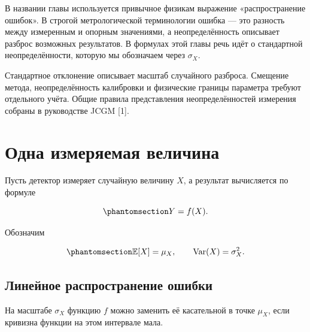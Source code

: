 \documentclass[
  russian,
  11pt,
  a4paper,
  open=any]{scrbook}
\begin{document}
В названии главы используется привычное физикам выражение
«распространение ошибок». В строгой метрологической терминологии ошибка
--- это разность между измеренным и опорным значениями, а
неопределённость описывает разброс возможных результатов. В формулах
этой главы речь идёт о стандартной неопределённости, которую мы
обозначаем через \(\sigma_X\).

Стандартное отклонение описывает масштаб случайного разброса. Смещение
метода, неопределённость калибровки и физические границы параметра
требуют отдельного учёта. Общие правила представления неопределённостей
измерения собраны в руководстве JCGM {[}1{]}.

\section{Одна измеряемая
величина}\label{ux43eux434ux43dux430-ux438ux437ux43cux435ux440ux44fux435ux43cux430ux44f-ux432ux435ux43bux438ux447ux438ux43dux430}

Пусть детектор измеряет случайную величину \(X\), а результат
вычисляется по формуле

\begin{equation}\protect\phantomsection\label{eq-ch6-one-variable-transformation}{
Y=f(X).
}\end{equation}

Обозначим

\begin{equation}\protect\phantomsection\label{eq-ch6-input-mean-variance}{
\mathbb E[X]=\mu_X,
\qquad
\operatorname{Var}(X)=\sigma_X^2.
}\end{equation}

\subsection{Линейное распространение
ошибки}\label{ux43bux438ux43dux435ux439ux43dux43eux435-ux440ux430ux441ux43fux440ux43eux441ux442ux440ux430ux43dux435ux43dux438ux435-ux43eux448ux438ux431ux43aux438}

На масштабе \(\sigma_X\) функцию \(f\) можно заменить её касательной в
точке \(\mu_X\), если кривизна функции на этом интервале мала.
\end{document}
